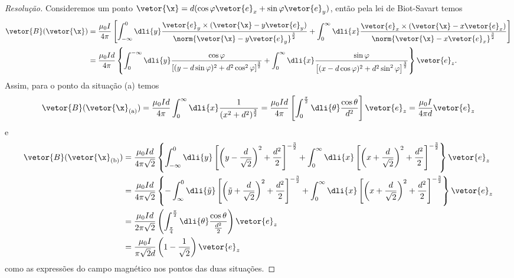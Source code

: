 \begin{proof}[Resolução]
    Consideremos um ponto \(\vetor{\x} = d(\cos\varphi \vetor{e}_x + \sin\varphi \vetor{e}_y)\), então pela lei de Biot-Savart temos
    \begin{align*}
        \vetor{B}(\vetor{\x}) &= \frac{\mu_0I}{4\pi} \left[\int_{-\infty}^0\dli{y} \frac{\vetor{e}_y \times (\vetor{\x} -y\vetor{e}_y)}{\norm{\vetor{\x} - y\vetor{e}_y}^{\frac32}} + \int_{0}^\infty \dli{x}\frac{\vetor{e}_x \times (\vetor{\x} - x\vetor{e}_x)}{\norm{\vetor{\x} - x\vetor{e}_x}^{\frac32}}\right]\\
                              &= \frac{\mu_0 I d}{4\pi} \left\{\int_{0}^{-\infty}\dli{y}\frac{\cos\varphi}{\left[(y - d\sin\varphi)^2 + d^2\cos^2\varphi\right]^{\frac32}} + \int_0^\infty\dli{x} \frac{\sin\varphi}{\left[(x - d\cos\varphi)^2 + d^2 \sin^2\varphi\right]^{\frac32}}\right\}\vetor{e}_z.
    \end{align*}
    Assim, para o ponto da situação (a) temos
    \begin{equation*}
        \vetor{B}(\vetor{\x}_{\mathrm{(a)}}) = \frac{\mu_0 I d}{4\pi} \int_0^\infty\dli{x}\frac{1}{(x^2 + d^2)^{\frac32}} = \frac{\mu_0 I d}{4\pi}\left[\int_{0}^{\frac{\pi}{2}}\dli{\theta} \frac{\cos\theta}{d^2}\right] \vetor{e}_z= \frac{\mu_0 I}{4\pi d} \vetor{e}_z
    \end{equation*}
    e
    \begin{align*}
        \vetor{B}(\vetor{\x}_\mathrm{(b)}) &= \frac{\mu_0 I d}{4\pi\sqrt{2}} \left\{ \int_{-\infty}^0\dli{y}\left[\left(y - \frac{d}{\sqrt{2}}\right)^2 + \frac{d^2}{2}\right]^{-\frac32} + \int_0^{\infty}\dli{x}\left[\left(x + \frac{d}{\sqrt{2}}\right)^2 + \frac{d^2}{2}\right]^{-\frac32}\right\}\vetor{e}_z\\
                                           &= \frac{\mu_0 I d}{4\pi\sqrt{2}} \left\{-\int_{\infty}^0\dli{\tilde{y}}\left[\left(\tilde{y} + \frac{d}{\sqrt{2}}\right)^2 + \frac{d^2}{2}\right]^{-\frac32} + \int_0^{\infty}\dli{x}\left[\left(x + \frac{d}{\sqrt{2}}\right)^2 + \frac{d^2}{2}\right]^{-\frac32}\right\}\vetor{e}_z\\
                                           &= \frac{\mu_0 I d}{2\pi \sqrt{2}} \left(\int_{\frac\pi4}^{\frac\pi2}\dli{\theta} \frac{\cos\theta}{\frac{d^2}{2}}\right)\vetor{e}_z\\
                                           &= \frac{\mu_0 I}{\pi \sqrt{2}d} \left(1 - \frac{1}{\sqrt{2}}\right)\vetor{e}_z
    \end{align*}
    como as expressões do campo magnético nos pontos das duas situações.
\end{proof}
